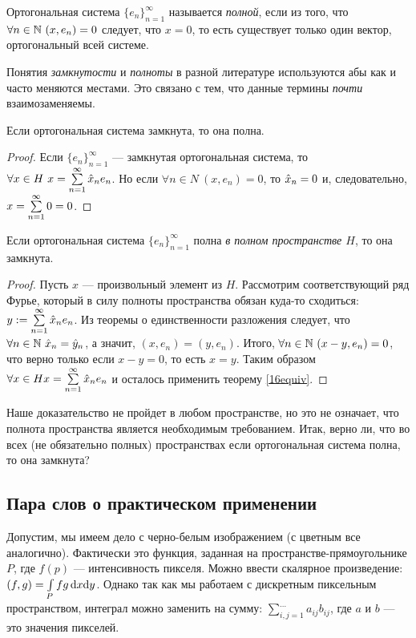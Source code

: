 \begin{Def}
Ортогональная система $\{e_n\}_{n=1}^{\infty}$ называется \textit{полной}, если из того, что $\forall n \in \mathbb{N} \ (x, e_n) = 0$ следует, что $x = 0$, то есть существует только один вектор, ортогональный всей системе.
\end{Def}

Понятия \textit{замкнутости} и \textit{полноты} в разной литературе используются абы как и часто меняются местами. Это связано с тем, что данные термины \textit{почти} взаимозаменяемы.

\begin{Statement}
Если ортогональная система замкнута, то она полна.
\end{Statement}
\begin{proof}
Если $\{e_n\}_{n=1}^{\infty}$ --- замкнутая ортогональная система, то $\forall x \in H\ x = \sum\limits_{n=1}^{\infty}\hat{x}_ne_n$. Но если $\forall n \in N\ (x, e_n) = 0$, то $\hat{x}_n = 0$ и, следовательно, $x = \sum\limits_{n=1}^{\infty} 0 = 0$. 
\end{proof}

\begin{Statement}
Если ортогональная система $\{e_n\}_{n=1}^{\infty}$ полна \textit{в полном пространстве $H$}, то она замкнута.
\end{Statement}
\begin{proof}
Пусть $x$ --- произвольный элемент из $H$. Рассмотрим соответствующий ряд Фурье, который в силу полноты пространства обязан куда-то сходиться: $y := \sum\limits_{n=1}^{\infty} \hat{x}_ne_n$. Из теоремы о единственности разложения следует, что $\forall n \in \mathbb{N}\ \hat{x}_n = \hat{y}_n$, а значит, $(x, e_n) = (y, e_n)$. Итого, $\forall n \in \mathbb{N} \ (x - y, e_n) = 0$, что верно только если $x - y = 0$, то есть $x = y$. Таким образом $\forall x \in H   x = \sum\limits_{n=1}^{\infty} \hat{x}_ne_n$ и осталось применить теорему \ref{16equiv}.
\end{proof}
\begin{Task}
Наше доказательство не пройдет в любом пространстве, но это не означает, что полнота пространства является необходимым требованием. Итак, верно ли, что во всех (не обязательно полных) пространствах если ортогональная система полна, то она замкнута?
\end{Task}

\subsection{Пара слов о практическом применении}
Допустим, мы имеем дело с черно-белым изображением (с цветным все аналогично). Фактически это функция, заданная на пространстве-прямоугольнике $P$, где $f(p)$ --- интенсивность пикселя. Можно ввести скалярное произведение: $(f, g) = \int\limits_P fg \,\mathrm{d} x\mathrm{d} y$. Однако так как мы работаем с дискретным пиксельным пространством, интеграл можно заменить на сумму: $\sum\limits_{i, j = 1}^{\dots}a_{ij}b_{ij}$, где $a$ и $b$ --- это значения пикселей.

